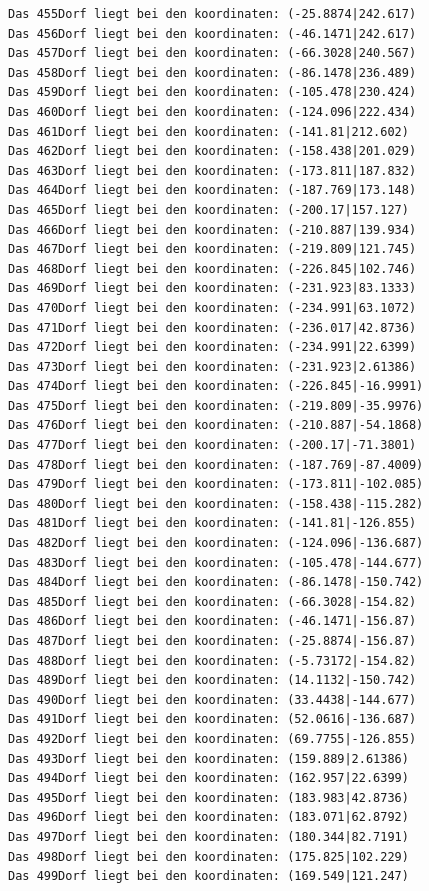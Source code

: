 \documentclass{article}
\begin{document}
\begin{verbatim}
Das 455Dorf liegt bei den koordinaten: (-25.8874|242.617)
Das 456Dorf liegt bei den koordinaten: (-46.1471|242.617)
Das 457Dorf liegt bei den koordinaten: (-66.3028|240.567)
Das 458Dorf liegt bei den koordinaten: (-86.1478|236.489)
Das 459Dorf liegt bei den koordinaten: (-105.478|230.424)
Das 460Dorf liegt bei den koordinaten: (-124.096|222.434)
Das 461Dorf liegt bei den koordinaten: (-141.81|212.602)
Das 462Dorf liegt bei den koordinaten: (-158.438|201.029)
Das 463Dorf liegt bei den koordinaten: (-173.811|187.832)
Das 464Dorf liegt bei den koordinaten: (-187.769|173.148)
Das 465Dorf liegt bei den koordinaten: (-200.17|157.127)
Das 466Dorf liegt bei den koordinaten: (-210.887|139.934)
Das 467Dorf liegt bei den koordinaten: (-219.809|121.745)
Das 468Dorf liegt bei den koordinaten: (-226.845|102.746)
Das 469Dorf liegt bei den koordinaten: (-231.923|83.1333)
Das 470Dorf liegt bei den koordinaten: (-234.991|63.1072)
Das 471Dorf liegt bei den koordinaten: (-236.017|42.8736)
Das 472Dorf liegt bei den koordinaten: (-234.991|22.6399)
Das 473Dorf liegt bei den koordinaten: (-231.923|2.61386)
Das 474Dorf liegt bei den koordinaten: (-226.845|-16.9991)
Das 475Dorf liegt bei den koordinaten: (-219.809|-35.9976)
Das 476Dorf liegt bei den koordinaten: (-210.887|-54.1868)
Das 477Dorf liegt bei den koordinaten: (-200.17|-71.3801)
Das 478Dorf liegt bei den koordinaten: (-187.769|-87.4009)
Das 479Dorf liegt bei den koordinaten: (-173.811|-102.085)
Das 480Dorf liegt bei den koordinaten: (-158.438|-115.282)
Das 481Dorf liegt bei den koordinaten: (-141.81|-126.855)
Das 482Dorf liegt bei den koordinaten: (-124.096|-136.687)
Das 483Dorf liegt bei den koordinaten: (-105.478|-144.677)
Das 484Dorf liegt bei den koordinaten: (-86.1478|-150.742)
Das 485Dorf liegt bei den koordinaten: (-66.3028|-154.82)
Das 486Dorf liegt bei den koordinaten: (-46.1471|-156.87)
Das 487Dorf liegt bei den koordinaten: (-25.8874|-156.87)
Das 488Dorf liegt bei den koordinaten: (-5.73172|-154.82)
Das 489Dorf liegt bei den koordinaten: (14.1132|-150.742)
Das 490Dorf liegt bei den koordinaten: (33.4438|-144.677)
Das 491Dorf liegt bei den koordinaten: (52.0616|-136.687)
Das 492Dorf liegt bei den koordinaten: (69.7755|-126.855)
Das 493Dorf liegt bei den koordinaten: (159.889|2.61386)
Das 494Dorf liegt bei den koordinaten: (162.957|22.6399)
Das 495Dorf liegt bei den koordinaten: (183.983|42.8736)
Das 496Dorf liegt bei den koordinaten: (183.071|62.8792)
Das 497Dorf liegt bei den koordinaten: (180.344|82.7191)
Das 498Dorf liegt bei den koordinaten: (175.825|102.229)
Das 499Dorf liegt bei den koordinaten: (169.549|121.247)

\end{verbatim}
\end{document}
